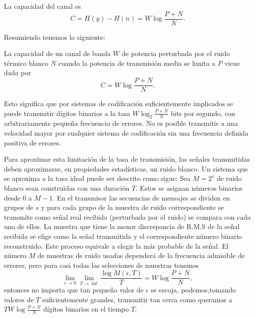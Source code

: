 La capacidad del canal es
\begin{equation}
C = H(y) - H(n) = W\log \frac{P + N}{N}.
\end{equation}
	
Resumiendo tenemos lo siguiente:

\begin{theorem}
\label{t17}	
La capacidad de un canal de banda $W$ de potencia perturbada por el
ruido t\'ermico blanco $N$ cuando la potencia de transmisi\'on media
se limita a $P$ viene dada por
\begin{equation}
C = W\log \frac{P + N}{N}.
\end{equation}
\end{theorem}
	
Esto significa que por sistemas de codificaci\'on suficientemente
implicados se puede transmitir d\'igitos binarios a la tasa
$W \log_{2}\frac{P + N}{N}$ bits por segundo, con arbitrariamente
peque\~na frecuencia de errores. No es posible transmitir a una
velocidad mayor por cualquier sistema de codificaci\'on sin una
frecuencia definida positiva de errores.
	
Para aproximar esta limitaci\'on de la tasa de transmisi\'on, las
se\~nales transmitidas deben aproximarse, en propiedades
estad\'isticas, un ruido blanco. Un sistema que se aproxima a la tasa
ideal puede ser descrito como sigue: Sea $M = 2^s$ de ruido blanco
sean construidas con una duraci\'{o}n $T$. Estos se asignan n\'umeros
binarios desde 0 a $M-1$. En el transmisor las secuencias de mensajes
se dividen en grupos de $s$ y para cada grupo de la muestra de ruido
correspondiente se transmite como se\~nal real recibida (perturbada
por el ruido) se compara con cada uno de ellos.  La muestra que tiene
la menor discrepancia de R.M.S de la se\~nal recibida se elige como la
se\~nal transmitida y el correspondiente n\'umero binario
reconstruido.  Este proceso equivale a elegir la m\'as probable de la
se\~nal.  El n\'umero $M$ de muestras de ruido usadas depender\'a de
la frecuencia admisible de errores, pero para casi todas las
selecciones de muestras tenemos
\begin{equation}
\lim_{\epsilon \to 0} \lim_{T\to \inf}
\frac{\log M(\epsilon, T)}{T} = W\log \frac{P+N}{N},
\end{equation}
entonces no importa que tan peque\~no valor de $\epsilon$ se escoja,
podemos,tomando valores de $T$ suficientemente grandes, transmitir tan
cerca como queramos a $TW\log \frac{P+N}{N}$ d\'igitos binarios en el
tiempo $T$.
	
